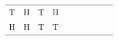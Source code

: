 {\begin{tabular}[t]{|l|l|l|l|l|l|l|l|l|l|}
    
        T &
    
    
        H &
    
    
        T &
    
    
        H%
     \tabularnewline\cline{1-1}\cline{2-2}\cline{3-3}\cline{4-4}\cline{5-5}\cline{6-6}\cline{7-7}\cline{8-8}\cline{9-9}\cline{10-10}
    
    
        H &
    
    
        H &
    
    
        T &
    
    
        T &
    
    

\end{tabular}}
